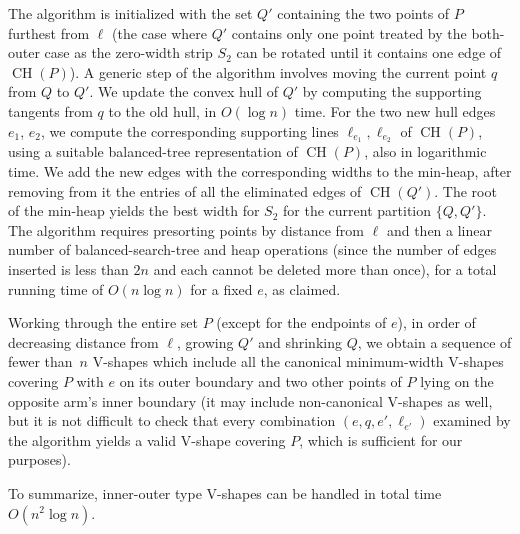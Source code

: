 \documentclass{llncs}
\DeclareMathOperator{\conv}{CH}
\begin{document}
The algorithm is initialized with the set $Q'$ containing the two points of $P$ furthest from $\ell$ (the case where $Q'$ contains 
only one point treated by the both-outer case as the zero-width strip $S_2$ can be rotated until it 
contains one edge of $\conv(P)$).  A generic step of the
algorithm involves moving the current point $q$ from $Q$ to $Q'$.  We
update the convex hull of $Q'$ by computing the supporting tangents
from $q$ to the old hull, in $O(\log n)$ time.  For the two new hull
edges $e_1$, $e_2$, we compute the corresponding supporting lines
$\ell_{e_1},\ell_{e_2}$ of $\conv(P)$, using a suitable balanced-tree
representation of $\conv(P)$, also in logarithmic time.  We add the new
edges with the corresponding widths to the min-heap, after removing
from it the entries of all the eliminated edges of $\conv(Q')$.  The
root of the min-heap yields the best width for $S_2$ for the current
partition $\{Q,Q'\}$.
The algorithm requires presorting points by distance from $\ell$ and
then a linear number of balanced-search-tree and heap operations
(since the number of edges inserted is less than $2n$ and each cannot
be deleted more than once), for a total running time of $O(n \log n)$
for a fixed $e$, as claimed.

Working through the entire set $P$ (except for the endpoints of $e$), in
order of decreasing distance from $\ell$, growing $Q'$ and shrinking
$Q$, we obtain a sequence of fewer than~$n$ V-shapes which include
all the canonical minimum-width V-shapes covering $P$ with $e$ on its
outer boundary and two other points of $P$ lying on the opposite arm's
inner boundary (it may include non-canonical V-shapes as well, but it
is not difficult to check  
that every combination $(e,q,e',\ell_{e'})$ examined
by the algorithm yields a valid V-shape covering $P$, which is
sufficient for our purposes). 


To summarize, inner-outer type V-shapes can be handled in total
time $O(n^2\log n)$.
\end{document}
